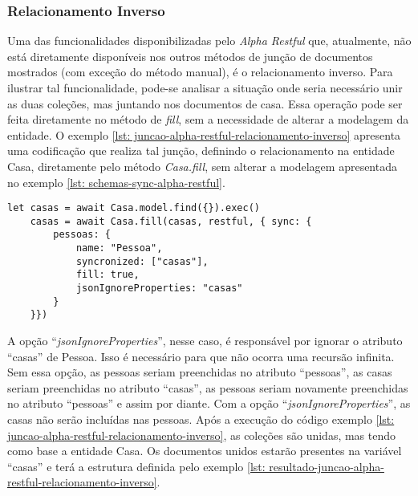 \subsubsection{Relacionamento Inverso\label{subsubsection: relacionamento-inverso}}

Uma das funcionalidades disponibilizadas pelo \textit{Alpha Restful} que, atualmente, não está diretamente disponíveis nos outros métodos de junção de documentos mostrados (com exceção do método manual), é o relacionamento inverso. Para ilustrar tal funcionalidade, pode-se analisar a situação onde seria necessário unir as duas coleções, mas juntando nos documentos de casa. Essa operação pode ser feita diretamente no método de \textit{fill}, sem a necessidade de alterar a modelagem da entidade. O exemplo \ref{lst: juncao-alpha-restful-relacionamento-inverso} apresenta uma codificação que realiza tal junção, definindo o relacionamento na entidade Casa, diretamente pelo método \textit{Casa.fill}, sem alterar a modelagem apresentada no exemplo \ref{lst: schemas-sync-alpha-restful}.


\begin{lstlisting}[style=ES6, caption={Junção de Documentos em Relacionamento Inverso\label{lst: juncao-alpha-restful-relacionamento-inverso}}]
    let casas = await Casa.model.find({}).exec()
    casas = await Casa.fill(casas, restful, { sync: {
        pessoas: {
            name: "Pessoa",
            syncronized: ["casas"],
            fill: true,
            jsonIgnoreProperties: "casas"
        }
    }})
\end{lstlisting}

A opção ``\textit{jsonIgnoreProperties}'', nesse caso, é responsável por ignorar o atributo ``casas'' de Pessoa. Isso é necessário para que não ocorra uma recursão infinita. Sem essa opção, as pessoas seriam preenchidas no atributo ``pessoas'', as casas seriam preenchidas no atributo ``casas'', as pessoas seriam novamente preenchidas no atributo ``pessoas'' e assim por diante. Com a opção ``\textit{jsonIgnoreProperties}'', as casas não serão incluídas nas pessoas. Após a execução do código exemplo \ref{lst: juncao-alpha-restful-relacionamento-inverso}, as coleções são unidas, mas tendo como base a entidade Casa. Os documentos unidos estarão presentes na variável ``casas'' e terá a estrutura definida pelo exemplo \ref{lst: resultado-juncao-alpha-restful-relacionamento-inverso}.


